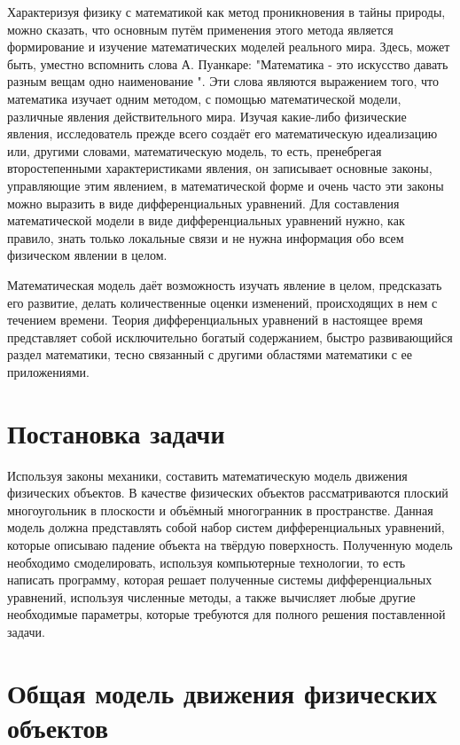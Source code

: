 \documentclass[12pt, a4paper]{extarticle}
\numberwithin{equation}{section}
\begin{document}
Характеризуя физику с математикой как метод проникновения в тайны природы, можно сказать, что основным путём применения этого метода является формирование и изучение математических моделей реального мира. Здесь, может быть, уместно вспомнить слова А. Пуанкаре: "Математика - это искусство давать разным вещам одно наименование ". Эти слова являются выражением того, что математика изучает одним методом, с помощью математической модели, различные явления действительного мира. Изучая какие-либо физические явления, исследователь прежде всего создаёт его математическую идеализацию или, другими словами, математическую модель, то есть, пренебрегая второстепенными характеристиками явления, он записывает основные законы, управляющие этим явлением, в математической форме и очень часто эти законы можно выразить в виде дифференциальных уравнений. Для составления математической модели в виде дифференциальных уравнений нужно, как правило, знать только локальные связи и не нужна информация обо всем физическом явлении в целом.

Математическая модель даёт возможность изучать явление в целом, предсказать его развитие, делать количественные оценки изменений, происходящих в нем с течением времени. Теория дифференциальных уравнений в настоящее время представляет собой исключительно богатый содержанием, быстро развивающийся раздел математики, тесно связанный с другими областями математики с ее приложениями.
\newpage

\section{Постановка задачи} 

Используя законы механики, составить математическую модель движения физических объектов. В качестве физических объектов рассматриваются плоский многоугольник в плоскости и объёмный многогранник в пространстве. Данная модель должна представлять собой набор систем дифференциальных уравнений, которые описываю падение объекта на твёрдую поверхность. Полученную модель необходимо смоделировать, используя компьютерные технологии, то есть написать программу, которая решает полученные системы дифференциальных уравнений, используя численные методы, а также вычисляет любые другие необходимые параметры, которые требуются для полного решения поставленной задачи.  

\newpage

\section{Общая модель движения физических объектов}
 
\end{document}
